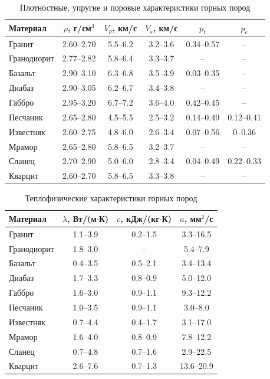 \documentclass[a4paper,12pt]{article}
\begin{document}
\begin{table}[h!]
\centering
\small
\renewcommand{\arraystretch}{1.15}

\begin{tabular}{lccccc}
\toprule
Материал &
$\rho$, г/см$^3$ &
$V_p$, км/с &
$V_s$, км/с &
$p_t$ &
$p_e$ \\
\midrule
Гранит      & 2.60--2.70 & 5.5--6.2 & 3.2--3.6 & 0.34--0.57 & -- \\
Гранодиорит & 2.77--2.82 & 5.8--6.4 & 3.3--3.7 & --         & -- \\
Базальт     & 2.90--3.10 & 6.3--6.8 & 3.5--3.9 & 0.03--0.35 & -- \\
Диабаз      & 2.90--3.05 & 6.2--6.7 & 3.4--3.8 & --         & -- \\
Габбро      & 2.95--3.20 & 6.7--7.2 & 3.6--4.0 & 0.42--0.45 & -- \\
Песчаник    & 2.65--2.80 & 4.5--5.5 & 2.5--3.2 & 0.14--0.49 & 0.12--0.41 \\
Известняк   & 2.60--2.75 & 4.8--6.0 & 2.6--3.4 & 0.07--0.56 & 0--0.36 \\
Мрамор      & 2.65--2.80 & 5.8--6.5 & 3.2--3.7 & --         & -- \\
Сланец      & 2.70--2.90 & 5.0--6.0 & 2.8--3.4 & 0.04--0.49 & 0.22--0.33 \\
Кварцит     & 2.60--2.70 & 5.8--6.5 & 3.3--3.8 & --         & -- \\
\bottomrule
\end{tabular}

\caption{Плотностные, упругие и поровые характеристики горных пород}
\label{tab:elastic-properties}
\end{table}

\begin{table}[h!]
\centering
\small
\renewcommand{\arraystretch}{1.15}

\begin{tabular}{lccc}
\toprule
Материал &
$\lambda$, Вт/(м$\cdot$К) &
$c$, кДж/(кг$\cdot$К) &
$a$, мм$^2$/с \\
\midrule
Гранит      & 1.1--3.9 & 0.2--1.5 & 3.3--16.5 \\
Гранодиорит & 1.8--3.0 & --       & 5.4--7.9  \\
Базальт     & 0.4--3.5 & 0.5--2.1 & 3.4--13.4 \\
Диабаз      & 1.7--3.3 & 0.8--0.9 & 5.0--12.0 \\
Габбро      & 1.6--3.0 & 0.9--1.1 & 9.3--12.2 \\
Песчаник    & 1.0--3.5 & 0.9--1.1 & 3.0--8.0  \\
Известняк   & 0.7--4.4 & 0.4--1.7 & 3.1--17.0 \\
Мрамор      & 1.6--4.0 & 0.8--0.9 & 7.8--12.2 \\
Сланец      & 0.7--4.8 & 0.7--1.6 & 2.9--22.5 \\
Кварцит     & 2.6--7.6 & 0.7--1.3 & 13.6--20.9 \\
\bottomrule
\end{tabular}

\caption{Теплофизические характеристики горных пород}
\label{tab:thermal-properties}
\end{table}
\end{document}
